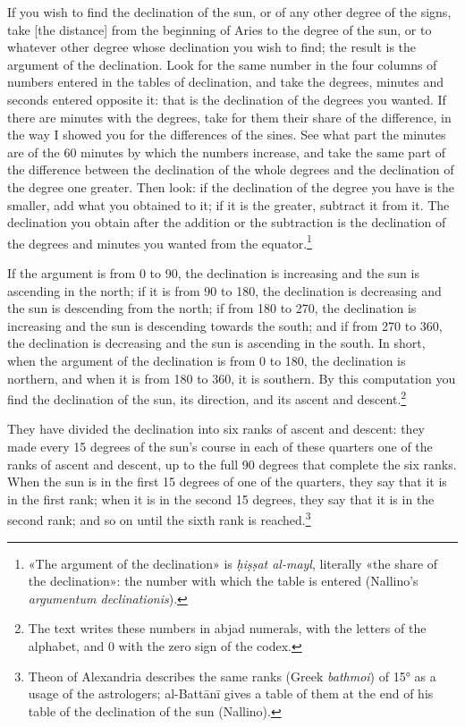 \documentclass[11pt]{article}
\begin{document}
\par If you wish to find the declination of the sun, or of any other degree of the signs, take [the distance] from the beginning of Aries to the degree of the sun, or to whatever other degree whose declination you wish to find; the result is the argument of the declination. Look for the same number in the four columns of numbers entered in the tables of declination, and take the degrees, minutes and seconds entered opposite it: that is the declination of the degrees you wanted. If there are minutes with the degrees, take for them their share of the difference, in the way I showed you for the differences of the sines. See what part the minutes are of the 60 minutes by which the numbers increase, and take the same part of the difference between the declination of the whole degrees and the declination of the degree one greater. Then look: if the declination of the degree you have is the smaller, add what you obtained to it; if it is the greater, subtract it from it. The declination you obtain after the addition or the subtraction is the declination of the degrees and minutes you wanted from the equator.\footnote{«The argument of the declination» is \emph{ḥiṣṣat al-mayl}, literally «the share of the declination»: the number with which the table is entered (Nallino's \emph{argumentum declinationis}).}\par
\par If the argument is from 0 to 90, the declination is increasing and the sun is ascending in the north; if it is from 90 to 180, the declination is decreasing and the sun is descending from the north; if from 180 to 270, the declination is increasing and the sun is descending towards the south; and if from 270 to 360, the declination is decreasing and the sun is ascending in the south. In short, when the argument of the declination is from 0 to 180, the declination is northern, and when it is from 180 to 360, it is southern. By this computation you find the declination of the sun, its direction, and its ascent and descent.\footnote{The text writes these numbers in abjad numerals, with the letters of the alphabet, and 0 with the zero sign of the codex.}\par
\par They have divided the declination into six ranks of ascent and descent: they made every 15 degrees of the sun's course in each of these quarters one of the ranks of ascent and descent, up to the full 90 degrees that complete the six ranks. When the sun is in the first 15 degrees of one of the quarters, they say that it is in the first rank; when it is in the second 15 degrees, they say that it is in the second rank; and so on until the sixth rank is reached.\footnote{Theon of Alexandria describes the same ranks (Greek \emph{bathmoi}) of 15° as a usage of the astrologers; al-Battānī gives a table of them at the end of his table of the declination of the sun (Nallino).}\par
\end{document}
